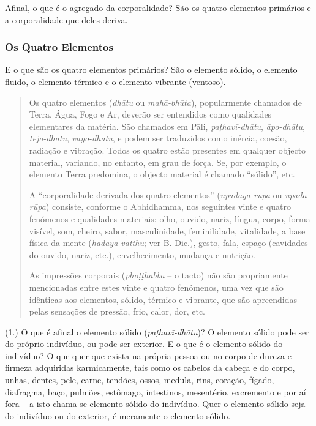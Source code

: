 
Afinal, o que é o agregado da corporalidade? São os quatro elementos primários e
a corporalidade que deles deriva.

\subsubsection{Os Quatro Elementos}

E o que são os quatro elementos primários? São o elemento sólido, o elemento
fluido, o elemento térmico e o elemento vibrante (ventoso).


\begin{quote}
  Os quatro elementos (\emph{dhātu} ou \emph{mahā-bhūta}), popularmente chamados
  de Terra, Água, Fogo e Ar, deverão ser entendidos como qualidades elementares
  da matéria. São chamados em Pāli, \emph{pa\d{t}havī-dhātu}, \emph{āpo-dhātu},
  \emph{tejo-dhātu}, \emph{vāyo-dhātu}, e podem ser traduzidos como inércia,
  coesão, radiação e vibração. Todos os quatro estão presentes em qualquer
  objecto material, variando, no entanto, em grau de força. Se, por exemplo, o
  elemento Terra predomina, o objecto material é chamado ``sólido'', etc.

  A ``corporalidade derivada dos quatro elementos'' (\emph{upādāya rūpa} ou
  \emph{upādā rūpa}) consiste, conforme o Abhidhamma, nos seguintes vinte e
  quatro fenómenos e qualidades materiais: olho, ouvido, nariz, língua, corpo,
  forma visível, som, cheiro, sabor, masculinidade, feminilidade, vitalidade, a
  base física da mente (\emph{hadaya-vatthu}; ver B. Dic.), gesto, fala, espaço
  (cavidades do ouvido, nariz, etc.), envelhecimento, mudança e nutrição.

  As impressões corporais (\emph{pho\d{t}\d{t}habba} -- o tacto) não são propriamente
  mencionadas entre estes vinte e quatro fenómenos, uma vez que são idênticas
  aos elementos, sólido, térmico e vibrante, que são apreendidas pelas sensações
  de pressão, frio, calor, dor, etc.
\end{quote}

(1.) O que é afinal o elemento sólido (\emph{paṭhavī-dhātu})? O elemento sólido
pode ser do próprio indivíduo, ou pode ser exterior. E o que é o elemento sólido
do indivíduo? O que quer que exista na própria pessoa ou no corpo de dureza e
firmeza adquiridas karmicamente, tais como os cabelos da cabeça e do corpo,
unhas, dentes, pele, carne, tendões, ossos, medula, rins, coração, fígado,
diafragma, baço, pulmões, estômago, intestinos, mesentério, excremento e por aí
fora -- a isto chama-se elemento sólido do indivíduo. Quer o elemento sólido
seja do indivíduo ou do exterior, é meramente o elemento sólido.


